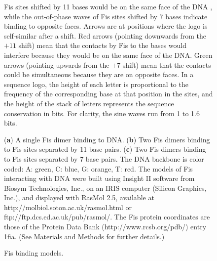 \documentclass[doublespacing]{narfront}
\begin{document}
\begin{figure}[ht]
Fis sites shifted by 11 bases
would be on the same face of the DNA
\cite{Papp.helixrepa,Schneider.oxyr,Schneider.baseflip.2001},
while
the out-of-phase waves
of Fis sites shifted by 7 bases
indicate binding to opposite faces.
Arrows are at positions where the logo is self-similar after a shift.
Red arrows
(pointing downwards from the $+11$ shift)
mean that the contacts by Fis to the bases would interfere
because they would be on the same face of the DNA.
Green arrows
(pointing upwards from the $+7$ shift)
mean that the contacts could be simultaneous because
they are on opposite faces.
In a sequence logo,
the height of each letter is proportional to the frequency of
the corresponding base at that position in the sites,
and the height of the stack of letters represents the
sequence conservation in bits.
For clarity, the
sine waves run from 1 to 1.6 bits.
\label{fig.selflogo}
\end{figure} %

\begin{figure}[ht] %
\begin{center}
\end{center}
\vspace{-12pt}
\caption{Fis binding models.}
(\textbf{a}) A single Fis dimer binding to DNA.
(\textbf{b}) Two Fis dimers binding to Fis sites separated
   by 11 base pairs.
(\textbf{c}) Two Fis dimers binding to Fis sites separated
   by 7 base pairs.
The DNA backbone is color coded:
A: green,
C: blue,
G: orange,
T: red.
The models of Fis interacting with
DNA were built using Insight II software from Biosym Technologies, Inc., on an
IRIS computer (Silicon Graphics, Inc.), and displayed with RasMol 2.5, available at
http://molbiol.soton.ac.uk/rasmol.html
or ftp://ftp.dcs.ed.ac.uk/pub/rasmol/.
The Fis
protein coordinates are those of the Protein Data Bank (http://www.rcsb.org/pdb/)
entry 1fia.
(See Materials and Methods for further details.)
\label{fig.fismodels}
\end{figure} %
\end{document}
